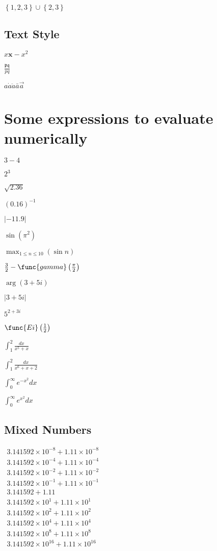 \documentclass{article}
\begin{document}
$\left\{ 1,2,3\right\} \cup \left\{ 2,3\right\} $

\subsection{Text Style}

$x\mathbf{x}-x^{2}$

$\frac{\mathfrak{pq}}{pq}$

$a\dot{a}\ddot{a}\bar{a}\vec{a}$

\section{Some expressions to evaluate numerically}

$3-4$

$2^{3}$

$\sqrt{2.36}$

$\left( 0.16\right) ^{-1}$

$\left\vert -11.9\right\vert $

$\sin \left( \pi ^{2}\right) $

$\max_{1\leq n\leq 10}\left( \sin n\right) $

$\frac{3}{2}-\func{gamma}\left( \frac{\pi }{2}\right) $

$\arg \left( 3+5i\right) $

$\left\vert 3+5i\right\vert $

$5^{2+3i}$

$\func{Ei}\left( \frac{1}{2}\right) $

$\int_{1}^{2}\frac{dx}{x^{5}+x}$

$\int_{1}^{2}\frac{dx}{x^{6}+x+2}$

$\int_{0}^{\infty }e^{-x^{2}}dx$

$\int_{0}^{\infty }e^{x^{2}}dx$

\subsection{Mixed Numbers}

$%
\begin{array}{c}
3.141592\times 10^{-8}+1.11\times 10^{-8} \\ 
3.141592\times 10^{-4}+1.11\times 10^{-4} \\ 
3.141592\times 10^{-2}+1.11\times 10^{-2} \\ 
3.141592\times 10^{-1}+1.11\times 10^{-1} \\ 
3.141592+1.11 \\ 
3.141592\times 10^{1}+1.11\times 10^{1} \\ 
3.141592\times 10^{2}+1.11\times 10^{2} \\ 
3.141592\times 10^{4}+1.11\times 10^{4} \\ 
3.141592\times 10^{8}+1.11\times 10^{8} \\ 
3.141592\times 10^{16}+1.11\times 10^{16}%
\end{array}%
$
\end{document}
